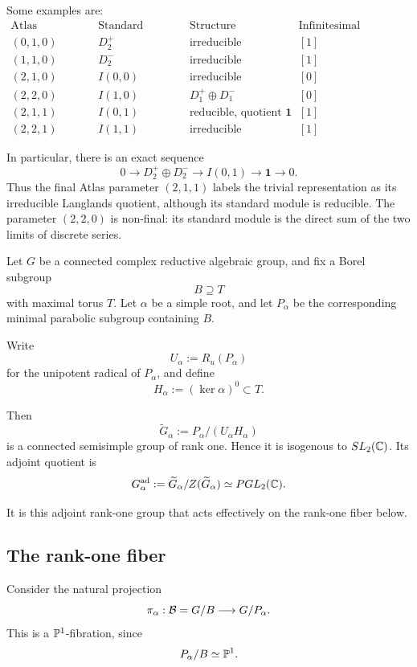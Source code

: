 Some examples are:
\[
\begin{array}{c|c|c|c}
\text{Atlas parameter}
& \text{Standard module}
& \text{Structure}
& \text{Infinitesimal character}\\ \hline
(0,1,0) & D_2^+ & \text{irreducible} & [1]\\
(1,1,0) & D_2^- & \text{irreducible} & [1]\\
(2,1,0) & I(0,0) & \text{irreducible} & [0]\\
(2,2,0) & I(1,0) & D_1^+\oplus D_1^- & [0]\\
(2,1,1) & I(0,1) & \text{reducible, quotient }\mathbf1 & [1]\\
(2,2,1) & I(1,1) & \text{irreducible} & [1]
\end{array}
\]

In particular, there is an exact sequence
\[
0\longrightarrow D_2^+\oplus D_2^-
\longrightarrow I(0,1)
\longrightarrow \mathbf1
\longrightarrow 0.
\]
Thus the final Atlas parameter $(2,1,1)$ labels the trivial
representation as its irreducible Langlands quotient, although its
standard module is reducible. The parameter $(2,2,0)$ is non-final:
its standard module is the direct sum of the two limits of discrete
series.



Let $G$ be a connected complex reductive algebraic group, and fix a Borel
subgroup
\[
B \supseteq T
\]
with maximal torus $T$. Let $\alpha$ be a simple root, and let $P_\alpha$
be the corresponding minimal parabolic subgroup containing $B$.

Write
\[
U_\alpha := R_u(P_\alpha)
\]
for the unipotent radical of $P_\alpha$, and define
\[
H_\alpha := (\ker \alpha)^0 \subset T.
\]

Then
\[
\widetilde G_\alpha
:=
P_\alpha/(U_\alpha H_\alpha)
\]
is a connected semisimple group of rank one. Hence it is isogenous to
$SL_2(\mathbb{C})$. Its adjoint quotient is
\[
G_\alpha^{\mathrm{ad}}
:=
\widetilde G_\alpha/Z(\widetilde G_\alpha)
\simeq PGL_2(\mathbb{C}).
\]

It is this adjoint rank-one group that acts effectively on the rank-one
fiber below.

\subsection*{The rank-one fiber}

Consider the natural projection
\[
\pi_\alpha:\mathcal{B}=G/B\longrightarrow G/P_\alpha.
\]
This is a $\mathbb{P}^1$-fibration, since
\[
P_\alpha/B\simeq \mathbb{P}^1.
\]

